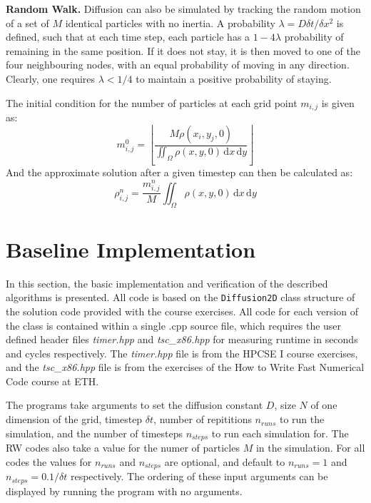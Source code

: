 \documentclass[letterpaper]{article}
\newcommand{\mypar}[1]{{\bf #1.}}
\begin{document}
\mypar{Random Walk}
Diffusion can also be simulated by tracking the random motion of a set of $M$ identical particles with no inertia. A probability $\lambda=D\delta t/\delta x^2$ is defined, such that at each time step, each particle has a $1-4\lambda$ probability of remaining in the same position. If it does not stay, it is then moved to one of the four neighbouring nodes, with an equal probability of moving in any direction. Clearly, one requires $\lambda<1/4$ to maintain a positive probability of staying.

The initial condition for the number of particles at each grid point $m_{i,j}$ is given as:
\begin{equation}
m_{i,j}^0=\left \lfloor{\frac{M\rho(x_i,y_j,0)}{\iint_\Omega \rho(x,y,0) \,\mathrm{d}x\,\mathrm{d}y}}\right \rfloor 
\end{equation}
And the approximate solution after a given timestep can then be calculated as:
\begin{equation}
\rho_{i,j}^n=\frac{m_{i,j}^n}{M}\iint_\Omega \rho(x,y,0)  \,\mathrm{d}x\,\mathrm{d}y
\end{equation}

\section{Baseline Implementation}\label{sec:baseline}

In this section, the basic implementation and verification of the described algorithms is presented. All code is based on the {\tt Diffusion2D} class structure of the solution code provided with the course exercises. All code for each version of the class is contained within a single .cpp source file, which requires the user defined header files \textit{timer.hpp} and \textit{tsc\_x86.hpp} for measuring runtime in seconds and cycles respectively. The \textit{timer.hpp} file is from the HPCSE I course exercises, and the \textit{tsc\_x86.hpp} file is from the exercises of the How to Write Fast Numerical Code course at ETH.

The programs take arguments to set the diffusion constant $D$, size $N$ of one dimension of the grid, timestep $\delta t$, number of repititions $n_{runs}$ to run the simulation, and the number of timesteps $n_{steps}$ to run each simulation for. The RW codes also take a value for the numer of particles $M$ in the simulation. For all codes the values for $n_{runs}$ and $n_{steps}$ are optional, and default to $n_{runs}=1$ and $n_{steps}=0.1/\delta t$ respectively. The ordering of these input arguments can be displayed by running the program with no arguments.
\end{document}
